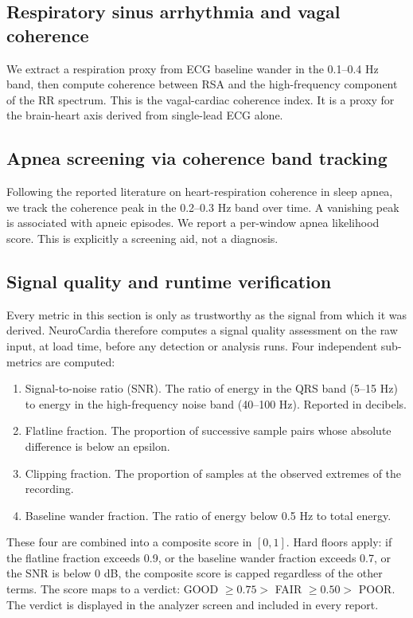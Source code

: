 \documentclass[11pt]{article}
\begin{document}
\subsection{Respiratory sinus arrhythmia and vagal coherence}

We extract a respiration proxy from ECG baseline wander in the
0.1--0.4 Hz band, then compute coherence between RSA and the
high-frequency component of the RR spectrum. This is the vagal-cardiac
coherence index. It is a proxy for the brain-heart axis derived from
single-lead ECG alone.

\subsection{Apnea screening via coherence band tracking}

Following the reported literature on heart-respiration coherence in
sleep apnea, we track the coherence peak in the 0.2--0.3 Hz band over
time. A vanishing peak is associated with apneic episodes. We report a
per-window apnea likelihood score. This is explicitly a screening aid,
not a diagnosis.

\subsection{Signal quality and runtime verification}

Every metric in this section is only as trustworthy as the signal from
which it was derived. NeuroCardia therefore computes a signal quality
assessment on the raw input, at load time, before any detection or
analysis runs. Four independent sub-metrics are computed:

\begin{enumerate}
\item Signal-to-noise ratio (SNR). The ratio of energy in the QRS band
(5--15 Hz) to energy in the high-frequency noise band (40--100 Hz).
Reported in decibels.
\item Flatline fraction. The proportion of successive sample pairs whose
absolute difference is below an epsilon.
\item Clipping fraction. The proportion of samples at the observed
extremes of the recording.
\item Baseline wander fraction. The ratio of energy below 0.5 Hz to
total energy.
\end{enumerate}

These four are combined into a composite score in $[0, 1]$. Hard floors
apply: if the flatline fraction exceeds 0.9, or the baseline wander
fraction exceeds 0.7, or the SNR is below 0 dB, the composite score is
capped regardless of the other terms. The score maps to a verdict:
GOOD $\geq 0.75 >$ FAIR $\geq 0.50 >$ POOR. The verdict is displayed
in the analyzer screen and included in every report.
\end{document}

